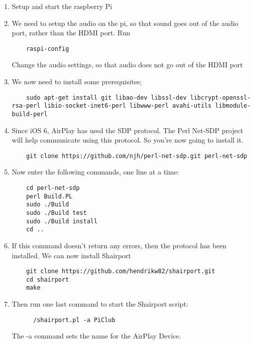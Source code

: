 \documentclass[11pt, oneside]{amsart}
\begin{document}
\begin{enumerate}
  \item Setup and start the raspberry Pi
  \item We need to setup the audio on the pi, so that sound goes out of the audio port, rather than the HDMI port. Run  \begin{verbatim}
    raspi-config
  \end{verbatim}
  Change the audio settings, so that audio does not go out of the HDMI port

  \item We now need to install some prerequisites;
  \begin{verbatim}
    sudo apt-get install git libao-dev libssl-dev libcrypt-openssl-rsa-perl libio-socket-inet6-perl libwww-perl avahi-utils libmodule-build-perl
  \end{verbatim}
  \item Since iOS 6, AirPlay has used the SDP protocol. The Perl Net-SDP project will help communicate using this protocol. So you’re now going to install it.
  \begin{verbatim}
    git clone https://github.com/njh/perl-net-sdp.git perl-net-sdp
  \end{verbatim}
  \item Now enter the following commands, one line at a time:
  \begin{verbatim}
    cd perl-net-sdp
    perl Build.PL
    sudo ./Build
    sudo ./Build test
    sudo ./Build install
    cd ..
  \end{verbatim}
  \item If this command doesn’t return any errors, then the protocol has been installed. We can now install Shairport
  \begin{verbatim}
    git clone https://github.com/hendrikw82/shairport.git
    cd shairport
    make
  \end{verbatim}
  \item Then run one last command to start the Shairport script:
    \begin{verbatim}
      /shairport.pl -a PiClub
    \end{verbatim}
  The -a command sets the name for the AirPlay Device.
\end{enumerate}
\end{document}
